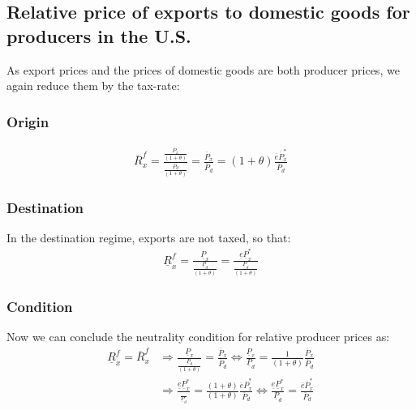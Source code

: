 \subsection*{Relative price of exports to domestic goods for producers in the U.S.}
As export prices and the prices of domestic goods are both producer prices, we again reduce them by the tax-rate: 
\subsubsection*{Origin}
\begin{equation}\label{xpro.o}
\begin{aligned}
\overline R^f_x = \frac{\frac{\overline P_x}{ \left( 1+\theta \right) }}{\frac{\overline P_d}{ \left( 1+\theta \right) }} = \frac{\overline P_x}{\overline P_d} =  \left( 1+\theta \right) \frac{\overline e \overline P^*_x}{\overline P_d}
\end{aligned} 
\end{equation}

\subsubsection*{Destination}
In the destination regime, exports are not taxed, so that:
\begin{equation}\label{xpro.d}
\begin{aligned}
\underline R^f_x = \frac{\underline P_x}{\frac{\underline P_d}{ \left( 1+\theta \right) }} = \frac{\underline e \underline P^*_x}{\frac{\underline P_d}{ \left( 1+\theta \right) }}
\end{aligned} 
\end{equation}

\subsubsection*{Condition}
Now we can conclude the neutrality condition for relative producer prices as:
\begin{equation}\label{xpro.diff}
\begin{aligned}
    \underline R^f_x = \overline R^f_x &\Rightarrow  \frac{\underline P_x}{\frac{\underline P_d}{ \left( 1+\theta \right) }} = \frac{\overline P_x}{\overline P_d} \Leftrightarrow \frac{\underline P_x}{\underline P_d} = \frac{1}{ \left( 1+\theta \right) } \frac{\overline P_x}{\overline P_d} \\ &\Rightarrow \frac{\underline e \underline P^*_x}{\frac{}{\underline P_d}} =  \frac{\left( 1+\theta \right)}{\left( 1+\theta \right)} \frac{\overline e \overline P^*_x}{\overline P_d} \Leftrightarrow \frac{\underline e \underline P^*_x}{\underline P_d} = \frac{\overline e \overline P^*_x}{\overline P_d}
\end{aligned} 
\end{equation}

